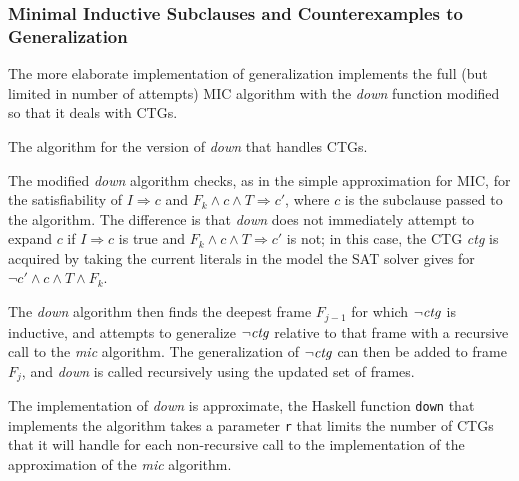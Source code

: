\documentclass[12pt,a4paper,twoside,openright]{report}
\begin{document}
{\subsubsection{Minimal Inductive Subclauses and Counterexamples to Generalization}
The more elaborate implementation of generalization implements the full
(but limited in number of attempts) MIC algorithm with the {\it down} function modified
so that it deals with CTGs.

\begin{algorithm}[!Ht]
\DontPrintSemicolon
{}
\caption{The algorithm for the version of {\it down} that handles CTGs.}
\label{mic}
\end{algorithm}

The modified {\it down} algorithm checks, as in the simple approximation for MIC, for the satisfiability of
$I \Rightarrow c$ and $F_k \wedge c \wedge T \Rightarrow c'$, where $c$ is the subclause passed to
the algorithm.
The difference is that {\it down} does not immediately attempt to expand $c$
if $I \Rightarrow c$ is true and $F_k \wedge c \wedge T \Rightarrow c'$ is
not; in this case, the CTG {\it ctg} is acquired by taking the current literals in
the model the SAT solver gives for $\neg c' \wedge c \wedge T \wedge F_k$.

The {\it down} algorithm then finds the deepest frame $F_{j - 1}$ for which $\neg {\it ctg}$ is inductive,
and attempts to generalize $\neg {\it ctg}$ relative to that frame with a recursive call to the
{\it mic} algorithm. The generalization of $\neg {\it ctg}$ can then be added to frame $F_j$,
and {\it down} is called recursively using the updated set of frames.

The implementation of {\it down} is approximate, the Haskell function \verb,down, that implements
the algorithm takes a parameter \verb,r, that limits the number of CTGs that it will handle for
each non-recursive call to the implementation of the approximation of the {\it mic} algorithm.

}
\end{document}
